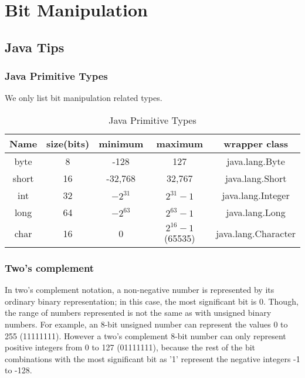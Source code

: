 \chapter{Bit Manipulation}




\section{Java Tips  }
\subsection{Java Primitive  Types } 


We only list bit manipulation related types.
\begin{table}[ht]
\caption{Java Primitive  Types} %
\centering %
\begin{tabular}{ | c | c | c | c | c |  }
 \hline
          Name   &  size(bits) & minimum    & maximum &  wrapper class   \\
 \hline
          byte   &  8          & -128       &  127    &  java.lang.Byte \\
 \hline
          short   &  16        &  -32,768   &   32,767     &  java.lang.Short \\
 \hline
          int   &   32          & ${-2^{31}}$       &   ${2^{31}-1}$    &  java.lang.Integer \\
 \hline
          long   &  64         & ${-2^{63}}$       &  ${2^{63}-1}$   &  java.lang.Long \\
 \hline
           char   &  16         & 0         &  ${2^{16}-1}$ (65535) &  java.lang.Character \\
 \hline

\end{tabular}
\label{tab:java_types} %

\end{table} 

\subsection{Two's complement }
In two's complement notation, a non-negative number is represented by its ordinary binary representation; in this case, the most significant bit is 0. Though, the range of numbers represented is not the same as with unsigned binary numbers. For example, an 8-bit unsigned number can represent the values 0 to 255 (11111111). However a two's complement 8-bit number can only represent positive integers from 0 to 127 (01111111), because the rest of the bit combinations with the most significant bit as '1' represent the negative integers -1 to -128.


